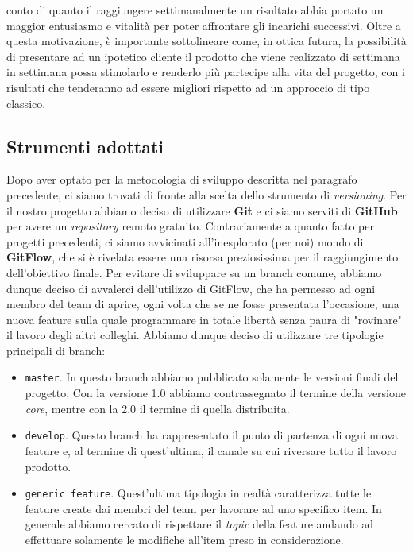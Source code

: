 conto di quanto il raggiungere settimanalmente un risultato abbia portato un maggior entusiasmo e vitalità per poter affrontare gli incarichi successivi. Oltre a questa motivazione, è importante sottolineare come, in ottica futura, la possibilità di presentare ad un ipotetico cliente il prodotto che viene realizzato di settimana in settimana possa stimolarlo e renderlo più partecipe alla vita del progetto, con i risultati che tenderanno ad essere migliori rispetto ad un approccio di tipo classico.
        
        
        \subsection {Strumenti adottati}\label{subsec:tools}
        Dopo aver optato per la metodologia di sviluppo descritta nel paragrafo precedente, ci siamo trovati di fronte alla scelta dello strumento di \textit{versioning}. Per il nostro progetto abbiamo deciso di utilizzare \textbf{Git} e ci siamo serviti di \textbf{GitHub} per avere un \textit{repository} remoto gratuito. Contrariamente a quanto fatto per progetti precedenti, ci siamo avvicinati all'inesplorato (per noi) mondo di \textbf{GitFlow}, che si è rivelata essere una risorsa preziosissima per il raggiungimento dell'obiettivo finale. Per evitare di sviluppare su un branch comune, abbiamo dunque deciso di avvalerci dell'utilizzo di GitFlow, che ha permesso ad ogni membro del team di aprire, ogni volta che se ne fosse presentata l'occasione, una nuova feature sulla quale programmare in totale libertà senza paura di "rovinare" il lavoro degli altri colleghi. Abbiamo dunque deciso di utilizzare tre tipologie principali di branch:
\begin{itemize}
\item \texttt{master}. In questo branch abbiamo pubblicato solamente le versioni finali del progetto. Con la versione 1.0 abbiamo contrassegnato il termine della versione \textit{core}, mentre con la 2.0 il termine di quella distribuita.
\item \texttt{develop}. Questo branch ha rappresentato il punto di partenza di ogni nuova feature e, al termine di quest'ultima, il canale su cui riversare tutto il lavoro prodotto. 
\item  \texttt{generic feature}. Quest'ultima tipologia in realtà caratterizza tutte le feature create dai membri del team per lavorare ad uno specifico item. In generale abbiamo cercato di rispettare il \textit{topic} della feature andando ad effettuare solamente le modifiche all'item preso in considerazione.
\end{itemize}
